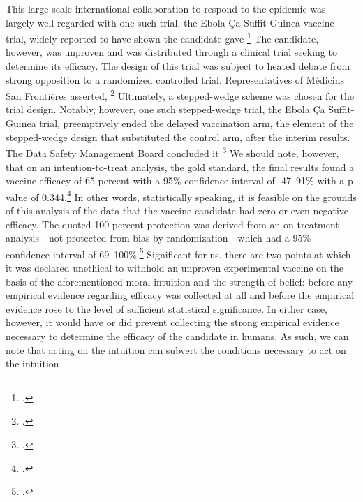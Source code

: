 \documentclass[letterpaper,notitlepage,12pt]{article}
\begin{document}
This large-scale international collaboration to respond to the epidemic was
largely well regarded with one such trial, the Ebola \c{C}a Suffit-Guinea
vaccine trial, widely reported to have shown the candidate gave \footcite{NYT}
The candidate, however, was unproven and was distributed through a clinical
trial seeking to determine its efficacy.
The design of this trial was subject to heated debate from strong opposition to
a randomized controlled trial.
Representatives of M\'{e}dicins San Fronti\`{e}res asserted, \footcite{Science}
Ultimately, a stepped-wedge scheme was chosen for the trial design.
Notably, however, one such stepped-wedge trial, the Ebola \c{C}a Suffit-Guinea
trial, preemptively ended the delayed vaccination arm, the element of the
stepped-wedge design that substituted the control arm, after the interim
results.
The Data Safety Management Board concluded it \footcite{UF}
We should note, however, that on an intention-to-treat analysis, the gold
standard, the final results found a vaccine efficacy of 65 percent with a 95\%
confidence interval of -47--91\% with a p-value of 0.344.\footcite{HR2016}
In other words, statistically speaking, it is feasible on the grounds of this
analysis of the data that the vaccine candidate had zero or even negative
efficacy.
The quoted 100 percent protection was derived from an on-treatment
analysis---not protected from bias by randomization---which had a 95\%
confidence interval of 69--100\%.\footcite{HR2016}
Significant for us, there are two points at which it was declared unethical to
withhold an unproven experimental vaccine on the basis of the aforementioned
moral intuition and the strength of belief: before any empirical evidence
regarding efficacy was collected at all and before the empirical evidence rose
to the level of sufficient statistical significance.
In either case, however, it would have or did prevent collecting the strong
empirical evidence necessary to determine the efficacy of the candidate in
humans.
As such, we can note that acting on the intuition  can subvert the conditions necessary to act on the
intuition 
\end{document}
